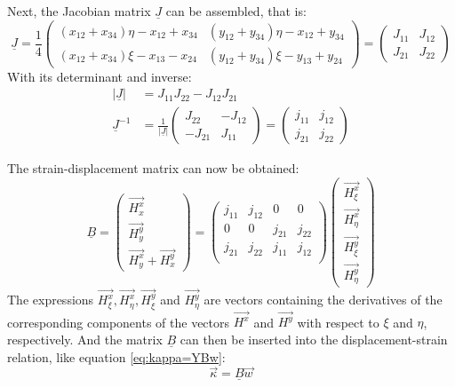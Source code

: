   Next, the Jacobian matrix $\underline{J}$ can be assembled, that is:
  \begin{equation}
  \underline{J} = \frac{1}{4} \begin{pmatrix}
  (x_{12}+x_{34})\eta - x_{12} + x_{34} & (y_{12} + y_{34})\eta - x_{12} + y_{34}\\
  (x_{12}+x_{34})\xi  - x_{13} - x_{24} & (y_{12} + y_{34})\xi  - y_{13} + y_{24}
  \end{pmatrix} = \begin{pmatrix}
  J_{11} & J_{12}\\ J_{21} & J_{22}
  \end{pmatrix}
  \end{equation}
  With its determinant and inverse:
  \begin{align}
  \left|\underline{J}\right| &= J_{11} J_{22} - J_{12} J_{21}\\
  \underline{J}^{-1} &= \frac{1}{\left|\underline{J}\right|} \begin{pmatrix}
  J_{22} & -J_{12}\\ -J_{21} & J_{11}
  \end{pmatrix} = \begin{pmatrix}
  j_{11} & j_{12}\\ j_{21} & j_{22}
  \end{pmatrix}
  \end{align}
  
  The strain-displacement matrix can now be obtained:
  \begin{equation}
  \underline{B} = \begin{pmatrix}
  \vec{H_x^x}\\\vec{H_y^y}\\\vec{H_y^x}+\vec{H_x^y}
  \end{pmatrix} = \begin{pmatrix}
  j_{11} & j_{12} & 0 & 0\\
  0 & 0 & j_{21} & j_{22}\\
  j_{21} & j_{22} & j_{11} & j_{12}\\
  \end{pmatrix} \begin{pmatrix}
  \vec{H_\xi^x}\\\vec{H_\eta^x}\\\vec{H_\xi^y}\\\vec{H_\eta^y}
  \end{pmatrix}
  \end{equation}
  The expressions $\vec{H_\xi^x}, \vec{H_\eta^x}, \vec{H_\xi^y}$ and $\vec{H_\eta^y}$ are vectors containing the derivatives of the corresponding components of the vectors $\vec{H^x}$ and $\vec{H^y}$ with respect to $\xi$ and $\eta$, respectively.
  And the matrix $\underline{B}$ can then be inserted into the displacement-strain relation, like equation \eqref{eq:kappa=YBw}:
  \begin{equation}
  \vec{\kappa} = \underline{B} \vec{w}
  \end{equation}
  
